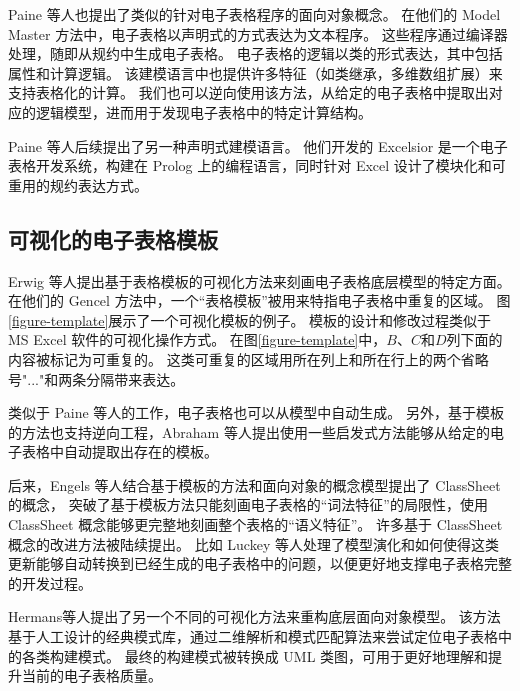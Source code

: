 Paine 等人\cite{ireson1997model,paine2008ensuring}也提出了类似的针对电子表格程序的面向对象概念。
在他们的 Model Master 方法中，电子表格以声明式的方式表达为文本程序。
这些程序通过编译器处理，随即从规约中生成电子表格。
电子表格的逻辑以类的形式表达，其中包括属性和计算逻辑。
该建模语言中也提供许多特征（如类继承，多维数组扩展）来支持表格化的计算。
我们也可以逆向使用该方法，从给定的电子表格中提取出对应的逻辑模型，进而用于发现电子表格中的特定计算结构\cite{paine2008spreadsheet}。

Paine 等人\cite{paine2005bringing,paine2008rapid}后续提出了另一种声明式建模语言。
他们开发的 Excelsior 是一个电子表格开发系统，构建在 Prolog 上的编程语言，同时针对 Excel 设计了模块化和可重用的规约表达方式。


\subsection{可视化的电子表格模板}
Erwig 等人\cite{erwig2004gencel,erwig2005automatic,abraham2005goal}提出基于表格模板的可视化方法来刻画电子表格底层模型的特定方面。
在他们的 Gencel 方法中，一个“表格模板”被用来特指电子表格中重复的区域。
图\ref{figure-template}展示了一个可视化模板的例子。
模板的设计和修改过程类似于 MS Excel 软件的可视化操作方式。
在图\ref{figure-template}中，$B$、$C$和$D$列下面的内容被标记为可重复的。
这类可重复的区域用所在列上和所在行上的两个省略号"..."和两条分隔带来表达。

类似于 Paine 等人的工作，电子表格也可以从模型中自动生成。
另外，基于模板的方法也支持逆向工程，Abraham 等人\cite{abraham2006inferring}提出使用一些启发式方法能够从给定的电子表格中自动提取出存在的模板。

后来，Engels 等人\cite{engels2005classsheets,cunha2010automatically}结合基于模板的方法和面向对象的概念模型提出了 ClassSheet 的概念，
突破了基于模板方法只能刻画电子表格的“词法特征”的局限性，使用 ClassSheet 概念能够更完整地刻画整个表格的“语义特征”。
许多基于 ClassSheet 概念的改进方法被陆续提出\cite{luckey2012systematic,cunha2011type,cunha2011embedding,cunha2012bidirectional}。
比如 Luckey 等人\cite{luckey2012systematic}处理了模型演化和如何使得这类更新能够自动转换到已经生成的电子表格中的问题，以便更好地支撑电子表格完整的开发过程。

Hermans等人\cite{hermans2010automatically}提出了另一个不同的可视化方法来重构底层面向对象模型。
该方法基于人工设计的经典模式库，通过二维解析和模式匹配算法来尝试定位电子表格中的各类构建模式。
最终的构建模式被转换成 UML 类图，可用于更好地理解和提升当前的电子表格质量。

